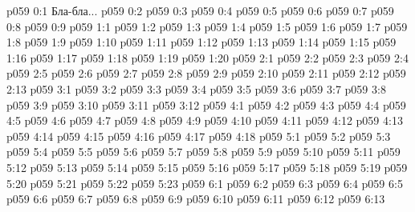 \author{Носитель Жизни}
\vs p059 0:1  Бла-бла...
\vs p059 0:2 
\vs p059 0:3 
\vs p059 0:4 
\vs p059 0:5 
\vs p059 0:6 
\vs p059 0:7 \pc 
\vs p059 0:8 
\vs p059 0:9 
\vs p059 1:1 
\vs p059 1:2 \pc 
\vs p059 1:3 
\vs p059 1:4 
\vs p059 1:5 
\vs p059 1:6 \pc 
\vs p059 1:7 
\vs p059 1:8 \pc 
\vs p059 1:9 \pc 
\vs p059 1:10 
\vs p059 1:11 
\vs p059 1:12 
\vs p059 1:13 
\vs p059 1:14 \pc 
\vs p059 1:15 \pc 
\vs p059 1:16 
\vs p059 1:17 \pc 
\vs p059 1:18 \pc 
\vs p059 1:19 
\vs p059 1:20 
\vs p059 2:1 
\vs p059 2:2 \pc 
\vs p059 2:3 \pc 
\vs p059 2:4 
\vs p059 2:5 \pc 
\vs p059 2:6 \pc 
\vs p059 2:7 \pc 
\vs p059 2:8 
\vs p059 2:9 \pc 
\vs p059 2:10 
\vs p059 2:11 
\vs p059 2:12 
\vs p059 2:13 \pc 
{}
\vs p059 3:1 
\vs p059 3:2 
\vs p059 3:3 \pc 
\vs p059 3:4 
\vs p059 3:5 
\vs p059 3:6 
\vs p059 3:7 
\vs p059 3:8 
\vs p059 3:9 \pc 
\vs p059 3:10 
\vs p059 3:11 
\vs p059 3:12 
\vs p059 4:1 
\vs p059 4:2 
\vs p059 4:3 
\vs p059 4:4 \pc 
\vs p059 4:5 
\vs p059 4:6 \pc 
\vs p059 4:7 
\vs p059 4:8 
\vs p059 4:9 \pc 
\vs p059 4:10 
\vs p059 4:11 
\vs p059 4:12 
\vs p059 4:13 
\vs p059 4:14 
\vs p059 4:15 \pc 
\vs p059 4:16 \pc 
\vs p059 4:17 \pc 
\vs p059 4:18 \pc 
{}
\vs p059 5:1 
\vs p059 5:2 \pc 
\vs p059 5:3 
\vs p059 5:4 \pc 
\vs p059 5:5 
\vs p059 5:6 
\vs p059 5:7 
\vs p059 5:8 
\vs p059 5:9 
\vs p059 5:10 
\vs p059 5:11 
\vs p059 5:12 
\vs p059 5:13 \pc 
\vs p059 5:14 
\vs p059 5:15 
\vs p059 5:16 
\vs p059 5:17 
\vs p059 5:18 
\vs p059 5:19 \pc 
\vs p059 5:20 \pc 
\vs p059 5:21 
\vs p059 5:22 
\vs p059 5:23 
\vs p059 6:1 
\vs p059 6:2 
\vs p059 6:3 
\vs p059 6:4 \pc 
\vs p059 6:5 
\vs p059 6:6 
\vs p059 6:7 \pc 
\vs p059 6:8 \pc 
\vs p059 6:9 
\vs p059 6:10 \pc 
\vs p059 6:11 
\vs p059 6:12 
\vsetoff
\vs p059 6:13 
\quizlink
